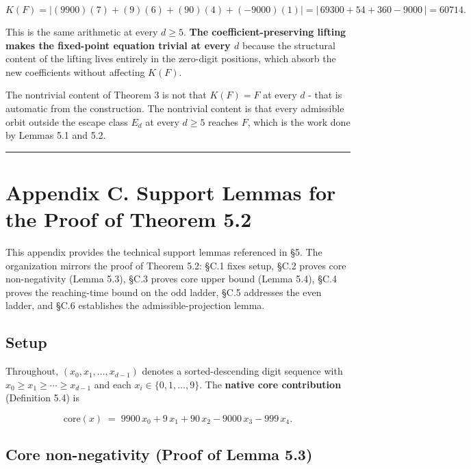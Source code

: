 \documentclass[11pt,letterpaper]{article}
\theoremstyle{paperstyle}
\theoremstyle{paperstyledef}
\theoremstyle{paperstylerem}
\begin{document}
\[K(F) = | (9900)(7) + (9)(6) + (90)(4) + (-9000)(1) | = |\,69300 + 54 + 360 - 9000\,| = 60714.\]

This is the same arithmetic at every \(d \geq 5\). \textbf{The
coefficient-preserving lifting makes the fixed-point equation trivial at
every \(d\)} because the structural content of the lifting lives
entirely in the zero-digit positions, which absorb the new coefficients
without affecting \(K(F)\).

The nontrivial content of Theorem 3 is not that \(K(F) = F\) at every
\(d\) - that is automatic from the construction. The nontrivial
content is that every admissible orbit outside the escape class \(E_d\)
at every \(d \geq 5\) reaches \(F\), which is the work done by Lemmas
5.1 and 5.2.

\begin{center}\rule{0.5\linewidth}{0.5pt}\end{center}

\hypertarget{appendix-c.-support-lemmas-for-the-proof-of-theorem-5.2}{%
\section{Appendix C. Support Lemmas for the Proof of Theorem
5.2}\label{appendix-c.-support-lemmas-for-the-proof-of-theorem-5.2}}

This appendix provides the technical support lemmas referenced in §5.
The organization mirrors the proof of Theorem 5.2: §C.1 fixes setup,
§C.2 proves core non-negativity (Lemma 5.3), §C.3 proves core upper
bound (Lemma 5.4), §C.4 proves the reaching-time bound on the odd
ladder, §C.5 addresses the even ladder, and §C.6 establishes the
admissible-projection lemma.

\hypertarget{c.1-setup}{%
\subsection{Setup}\label{c.1-setup}}

Throughout, \((x_0, x_1, \ldots, x_{d-1})\) denotes a sorted-descending
digit sequence with \(x_0 \geq x_1 \geq \cdots \geq x_{d-1}\) and each
\(x_i \in \{0, 1, \ldots, 9\}\). The \textbf{native core contribution}
(Definition 5.4) is

\[\mathrm{core}(x) \;=\; 9900 \, x_0 + 9 \, x_1 + 90 \, x_2 - 9000 \, x_3 - 999 \, x_4.\]

\hypertarget{c.2-core-non-negativity-proof-of-lemma-5.3}{%
\subsection{Core non-negativity (Proof of Lemma 5.3)}\label{c.2-core-non-negativity-proof-of-lemma-5.3}}
\end{document}
